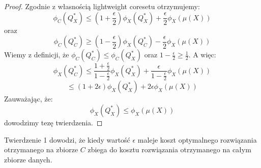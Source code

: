 \begin{proof}
    Zgodnie z własnością lightweight coresetu otrzymujemy:
    \begin{equation}
        \phi_{C}(Q_{X}^{*})  \leq (1+\frac{\epsilon}{2})\phi_{X}(Q_{X}^{*}) + \frac{\epsilon}{2}\phi_{X}(\mu(X))
    \end{equation}
    oraz
    \begin{equation}
        \phi_{C}(Q_{C}^{*})  \geq (1-\frac{\epsilon}{2})\phi_{X}(Q_{C}^{*}) - \frac{\epsilon}{2}\phi_{X}(\mu(X))
    \end{equation}
    Wiemy z definicji, że $\phi_{C}(Q_{C}^{*}) \leq  \phi_{C}(Q_{X}^{*})$ oraz $1 - \frac{\epsilon}{2} \geq \frac{1}{2}$.
    A więc:
    \begin{equation}
        \phi_{X}(Q_{C}^{*}) \leq \frac{1+\frac{\epsilon}{2}}{1-\frac{\epsilon}{2}}\phi_{X}(Q_{X}^{*}) + \frac{\epsilon}{1-\frac{\epsilon}{2}}\phi_{X}(\mu(X))
    \end{equation}
    \begin{equation}
        \leq (1+2\epsilon)\phi_{X}(Q_{X}^{*}) + 2\epsilon\phi_{X}(\mu(X))
    \end{equation}
    Zauważając, że:
    \begin{equation}
        \phi_{X}(Q_{X}^{*}) \leq \phi_{X}(\mu(X))
    \end{equation}
    dowodzimy tezę twierdzenia.
\end{proof}

\noindent
Twierdzenie 1 dowodzi, że kiedy wartość $\epsilon$ maleje koszt optymalnego rozwiązania otrzymanego na zbiorze $C$ zbiega do kosztu rozwiązania otrzymanego na całym zbiorze danych.